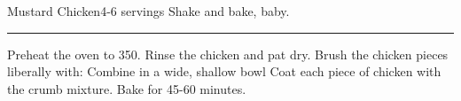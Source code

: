 \begin{recipe}{Mustard Chicken}{4-6 servings}{}
\freeform Shake and bake, baby.\\
\rule{\textwidth}{0.05pt}
Preheat the oven to 350\0. Rinse the chicken and pat dry.
Brush the chicken pieces liberally with:
Combine in a wide, shallow bowl
\freeform Coat each piece of chicken with the crumb mixture.  Bake for 45-60
minutes.
\end{recipe}

